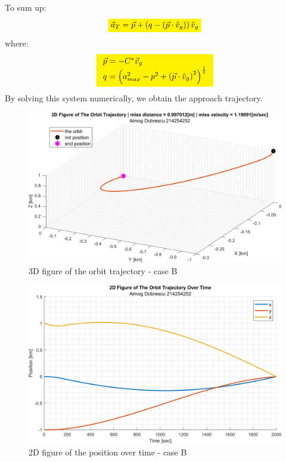 \documentclass[11pt, a4paper]{article}
\begin{document}
\noindent To sum up:
\begin{equation*}
    \colorbox{yellow}{$\vec{a}_T=\vec{p}+\left(q-\left(\vec{p}\cdot\hat{v}_g\right)\right)\hat{v}_g$}
\end{equation*}
where:
\begin{equation*}
    \colorbox{yellow}{$ \begin{array}{l}
        \vec{p} = -C^*\vec{v}_g \\
        q =\left(a_{max}^2-p^2+\left(\vec{p}\cdot\hat{v}_g\right)^2\right)^{\frac{1}{2}}
    \end{array} $}
\end{equation*}
By solving this system numerically, we obtain the approach trajectory.
\begin{figure}[H]
    \centering
    \includegraphics[width=1\textwidth]{images/graph5.png}
    \caption{3D figure of the orbit trajectory - case B}
    \label{fig:3D-plot-caseB}
\end{figure}
\begin{figure}[H]
    \centering
    \includegraphics[width=1\textwidth]{images/graph6.png}
    \caption{2D figure of the position over time - case B}
    \label{fig:2D-plot_over_time-caseB}
\end{figure}
\end{document}
